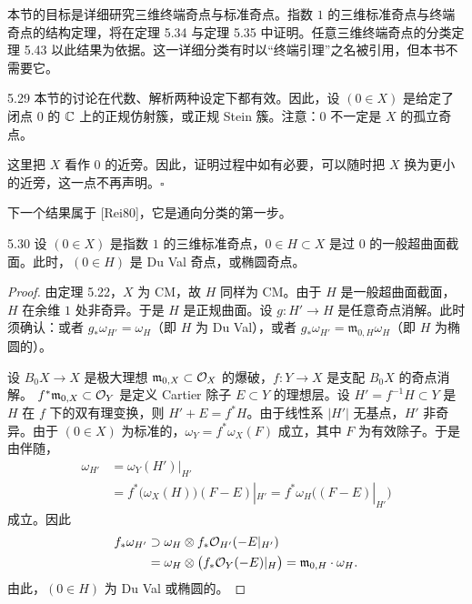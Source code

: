 本节的目标是详细研究三维终端奇点与标准奇点。指数 $1$ 的三维标准奇点与终端奇点的结构定理，将在定理 5.34 与定理 5.35 中证明。任意三维终端奇点的分类定理 5.43 以此结果为依据。这一详细分类有时以“终端引理”之名被引用，但本书不需要它。

\begin{notation}{5.29}
本节的讨论在代数、解析两种设定下都有效。因此，设 $(0\in X)$ 是给定了闭点 $0$ 的 $\mathbb{C}$ 上的正规仿射簇，或正规 Stein 簇。注意：$0$ 不一定是 $X$ 的孤立奇点。

这里把 $X$ 看作 $0$ 的近旁。因此，证明过程中如有必要，可以随时把 $X$ 换为更小的近旁，这一点不再声明。\hfill$\square$
\end{notation}


下一个结果属于 [Rei80]，它是通向分类的第一步。

\begin{lemmap}{5.30}
设 $(0\in X)$ 是指数 $1$ 的三维标准奇点，$0\in H\subset X$ 是过 $0$ 的一般超曲面截面。此时，$(0\in H)$ 是 Du Val 奇点，或椭圆奇点。
\end{lemmap}

\begin{proof}
由定理 5.22，$X$ 为 CM，故 $H$ 同样为 CM。由于 $H$ 是一般超曲面截面，$H$ 在余维 $1$ 处非奇异。于是 $H$ 是正规曲面。设 $g\colon H'\to H$ 是任意奇点消解。此时须确认：或者 $g_*\omega_{H'}=\omega_H$（即 $H$ 为 Du Val），或者 $g_*\omega_{H'}=\mathfrak{m}_{0,H}\omega_H$（即 $H$ 为椭圆的）。

设 $B_0X\to X$ 是极大理想 $\mathfrak{m}_{0,X}\subset\mathcal{O}_X$ 的爆破，$f\colon Y\to X$ 是支配 $B_0X$ 的奇点消解。
$f^*\mathfrak{m}_{0,X}\subset\mathcal{O}_Y$ 是定义 Cartier 除子 $E\subset Y$ 的理想层。设 $H'=f^{-1}H\subset Y$ 是 $H$ 在 $f$ 下的双有理变换，则 $H'+E=f^*H$。由于线性系 $|H'|$ 无基点，$H'$ 非奇异。由于 $(0\in X)$ 为标准的，$\omega_Y=f^*\omega_X(F)$ 成立，其中 $F$ 为有效除子。于是由伴随，
\[
\begin{aligned}
\omega_{H'} &= \omega_Y(H')|_{H'}\\
&= f^*\bigl(\omega_X(H)\bigr)(F-E)|_{H'}=f^*\omega_H\bigl((F-E)|_{H'}\bigr)
\end{aligned}
\]
成立。因此
\[
\begin{aligned}
f_*\omega_{H'} &\supset \omega_H\otimes f_*\mathcal{O}_{H'}(-E|_{H'})\\
&= \omega_H\otimes\bigl(f_*\mathcal{O}_Y(-E)|_H\bigr)=\mathfrak{m}_{0,H}\cdot\omega_H.
\end{aligned}
\]
由此，$(0\in H)$ 为 Du Val 或椭圆的。
\end{proof}

